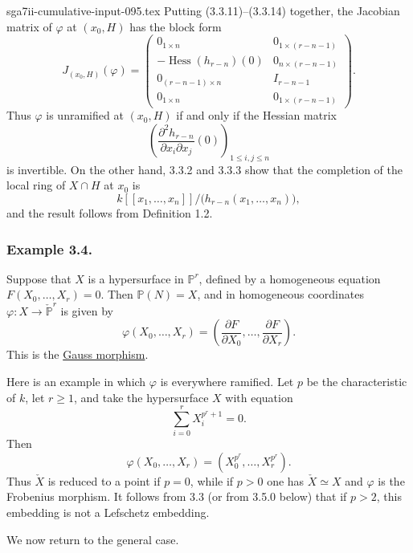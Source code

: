 \begin{filecontents*}{sga7ii-cumulative-input-095.tex}
Putting (3.3.11)--(3.3.14) together, the Jacobian matrix of
$\varphi$ at $(x_0,H)$ has the block form
\begin{equation}\tag{3.3.15}
J_{(x_0,H)}(\varphi)=
\left(
\begin{array}{c|c}
0_{1\times n} & 0_{1\times(r-n-1)}\\ \hline
-\operatorname{Hess}(h_{r-n})(0) & 0_{n\times(r-n-1)}\\ \hline
0_{(r-n-1)\times n} & I_{r-n-1}\\ \hline
0_{1\times n} & 0_{1\times(r-n-1)}
\end{array}
\right).
\end{equation}
Thus $\varphi$ is unramified at $(x_0,H)$ if and only if the Hessian
matrix
\[
\left(
\frac{\partial^2h_{r-n}}{\partial x_i\partial x_j}(0)
\right)_{1\leq i,j\leq n}
\]
is invertible.  On the other hand, 3.3.2 and 3.3.3 show that the
completion of the local ring of $X\cap H$ at $x_0$ is
\begin{equation}\tag{3.3.16}
k[[x_1,\ldots,x_n]]/
\bigl(h_{r-n}(x_1,\ldots,x_n)\bigr),
\end{equation}
and the result follows from Definition 1.2.

\subsubsection*{Example 3.4.}
Suppose that $X$ is a hypersurface in $\mathbb P^r$, defined by a
homogeneous equation $F(X_0,\ldots,X_r)=0$.  Then
$\mathbb P(N)=X$, and in homogeneous coordinates
$\varphi:X\to\check{\mathbb P}^{r}$ is given by
\begin{equation}\tag{3.4.1}
\varphi(X_0,\ldots,X_r)=
\left(
\frac{\partial F}{\partial X_0},\ldots,
\frac{\partial F}{\partial X_r}
\right).
\end{equation}
This is the \underline{Gauss morphism}.

Here is an example in which $\varphi$ is everywhere ramified.  Let
$p$ be the characteristic of $k$, let $r\geq1$, and take the
hypersurface $X$ with equation
\begin{equation}\tag{3.4.2}
\sum_{i=0}^{r}X_i^{p^r+1}=0.
\end{equation}
Then
\begin{equation}\tag{3.4.3}
\varphi(X_0,\ldots,X_r)
=(X_0^{p^r},\ldots,X_r^{p^r}).
\end{equation}
Thus $\check X$ is reduced to a point if $p=0$, while if $p>0$ one
has $\check X\simeq X$ and $\varphi$ is the Frobenius morphism.  It
follows from 3.3 (or from 3.5.0 below) that if $p>2$, this embedding is
not a Lefschetz embedding.

We now return to the general case.
\end{filecontents*}
